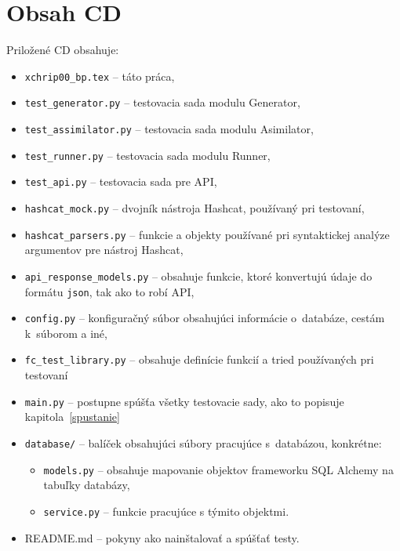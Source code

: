 \chapter{Obsah CD}
\label{cd}
Priložené CD obsahuje:
\begin{itemize}
	\item \texttt{xchrip00\_bp.tex} -- táto práca,
	\item \texttt{test\_generator.py} -- testovacia sada modulu Generator,
	\item \texttt{test\_assimilator.py} -- testovacia sada modulu Asimilator,
	\item \texttt{test\_runner.py} -- testovacia sada modulu Runner,
	\item \texttt{test\_api.py} -- testovacia sada pre API,
	\item \texttt{hashcat\_mock.py} -- dvojník nástroja Hashcat, používaný pri testovaní,
	\item \texttt{hashcat\_parsers.py} -- funkcie a objekty používané pri syntaktickej analýze argumentov pre nástroj Hashcat,
	\item \texttt{api\_response\_models.py} -- obsahuje funkcie, ktoré konvertujú údaje do formátu \texttt{json}, tak ako to robí API,
	\item \texttt{config.py} -- konfiguračný súbor obsahujúci informácie o~databáze, cestám k~súborom a iné,
	\item \texttt{fc\_test\_library.py} -- obsahuje definície funkcií a tried používaných pri testovaní
	\item \texttt{main.py} -- postupne spúšťa všetky testovacie sady, ako to popisuje kapitola~\ref{spustanie}
	\item \texttt{database/} -- balíček obsahujúci súbory pracujúce s~databázou, konkrétne:
		\begin{itemize}
			\item \texttt{models.py} -- obsahuje mapovanie objektov frameworku SQL Alchemy na tabuľky databázy,
			\item \texttt{service.py} -- funkcie pracujúce s týmito objektmi.
		\end{itemize}
	\item README.md -- pokyny ako nainštalovať a spúšťať testy.
\end{itemize}

